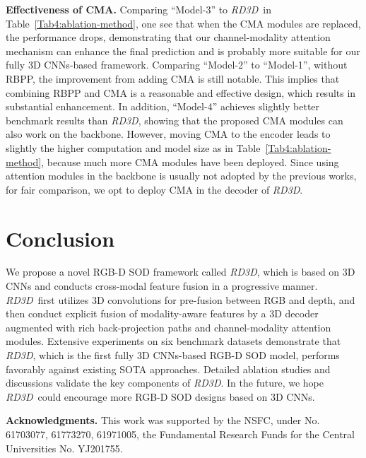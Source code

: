 \documentclass[letterpaper]{article}
\def\ourmodel{\emph{RD3D}}
\begin{document}
\noindent \textbf{Effectiveness of CMA.} Comparing ``Model-3'' to \ourmodel~in Table~\ref{Tab4:ablation-method}, one see that when the CMA modules are replaced, the performance drops, demonstrating that our channel-modality attention mechanism can enhance the final prediction and is probably more suitable for our fully 3D CNNs-based framework. Comparing ``Model-2'' to ``Model-1'', without RBPP, the improvement from adding CMA is still notable. This implies that combining RBPP and CMA is a reasonable and effective design, which results in substantial enhancement. 
In addition, ``Model-4'' achieves slightly better benchmark results than \ourmodel, showing that the proposed CMA modules can also work on the backbone. However, moving CMA to the encoder leads to slightly the higher computation and model size as in Table~\ref{Tab4:ablation-method}, because much more CMA modules have been deployed. Since using attention modules in the backbone is usually not adopted by the previous works, for fair comparison, we opt to deploy CMA in the decoder of \ourmodel.  


\section{Conclusion} 
We propose a novel RGB-D SOD framework called \ourmodel, which is based on 3D CNNs and conducts cross-modal feature fusion in a progressive manner. \ourmodel~first utilizes 3D convolutions for pre-fusion between RGB and depth, and then conduct explicit fusion of modality-aware features by a 3D decoder augmented with rich back-projection paths and channel-modality attention modules. Extensive experiments on six benchmark datasets demonstrate that \ourmodel, which is the first fully 3D CNNs-based RGB-D SOD model, performs favorably against existing SOTA approaches. Detailed ablation studies and discussions validate the key components of \ourmodel. In the future, we hope \ourmodel~could encourage more RGB-D SOD designs based on 3D CNNs.   

\vspace{-2pt}
\small{\vspace{.1in}\noindent\textbf{Acknowledgments.}\quad
This work was supported by the NSFC, under No. 61703077, 61773270, 61971005, the
Fundamental Research Funds for the Central Universities No. YJ201755.}


\end{document}
